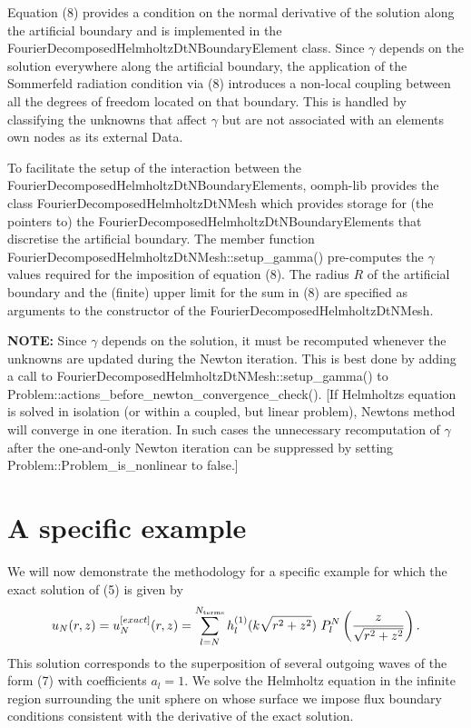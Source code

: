 Equation (8) provides a condition on the normal derivative of the solution along the artificial boundary and is implemented in the {\ttfamily Fourier\+Decomposed\+Helmholtz\+Dt\+N\+Boundary\+Element} class. Since $ \gamma $ depends on the solution everywhere along the artificial boundary, the application of the Sommerfeld radiation condition via (8) introduces a non-\/local coupling between all the degrees of freedom located on that boundary. This is handled by classifying the unknowns that affect $ \gamma $ but are not associated with an element\textquotesingle{}s own nodes as its external {\ttfamily Data}.

To facilitate the setup of the interaction between the {\ttfamily Fourier\+Decomposed\+Helmholtz\+Dt\+N\+Boundary\+Elements}, {\ttfamily oomph-\/lib} provides the class {\ttfamily Fourier\+Decomposed\+Helmholtz\+Dt\+N\+Mesh} which provides storage for (the pointers to) the {\ttfamily Fourier\+Decomposed\+Helmholtz\+Dt\+N\+Boundary\+Elements} that discretise the artificial boundary. The member function {\ttfamily Fourier\+Decomposed\+Helmholtz\+Dt\+N\+Mesh\+::setup\+\_\+gamma()} pre-\/computes the $ \gamma $ values required for the imposition of equation (8). The radius $ R $ of the artificial boundary and the (finite) upper limit for the sum in (8) are specified as arguments to the constructor of the {\ttfamily Fourier\+Decomposed\+Helmholtz\+Dt\+N\+Mesh}.

{\bfseries N\+O\+TE\+:} Since $ \gamma $ depends on the solution, it must be recomputed whenever the unknowns are updated during the Newton iteration. This is best done by adding a call to {\ttfamily Fourier\+Decomposed\+Helmholtz\+Dt\+N\+Mesh\+::setup\+\_\+gamma()} to {\ttfamily Problem\+::actions\+\_\+before\+\_\+newton\+\_\+convergence\+\_\+check()}. \mbox{[}If Helmholtz\textquotesingle{}s equation is solved in isolation (or within a coupled, but linear problem), Newton\textquotesingle{}s method will converge in one iteration. In such cases the unnecessary recomputation of $ \gamma $ after the one-\/and-\/only Newton iteration can be suppressed by setting {\ttfamily Problem\+::\+Problem\+\_\+is\+\_\+nonlinear} to {\ttfamily false}.\mbox{]}



 

\hypertarget{index_scattering}{}\section{A specific example}\label{index_scattering}
We will now demonstrate the methodology for a specific example for which the exact solution of (5) is given by \[ u_N(r,z)=u_N^{[exact]}(r,z)=\sum_{l=N}^{N_{\rm terms}} h_{l}^{(1)}(k\sqrt{r^2+z^2}) \ P_{l}^{N}\left(\frac{z}{\sqrt{r^2+z^2}}\right). \] This solution corresponds to the superposition of several outgoing waves of the form (7) with coefficients $ a_l = 1 $. We solve the Helmholtz equation in the infinite region surrounding the unit sphere on whose surface we impose flux boundary conditions consistent with the derivative of the exact solution.

